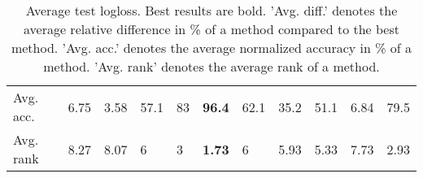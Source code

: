\begin{table}[ht!]
\begin{tabular}{lllllllllll}
  Avg. acc. & 6.75 & 3.58 & 57.1 & 83 & \textbf{96.4} & 62.1 & 35.2 & 51.1 & 6.84 & 79.5 \\ 
  Avg. rank & 8.27 & 8.07 & 6 & 3 & \textbf{1.73} & 6 & 5.93 & 5.33 & 7.73 & 2.93 \\ 
   \hline
\hline
\end{tabular}
\endgroup
\caption{Average test logloss. 
                  Best results are bold. 
                  'Avg. diff.' denotes the average relative difference in \% of a method compared to the best method.
                  'Avg. acc.' denotes the average normalized accuracy in \% of a method.
                  'Avg. rank' denotes the average rank of a method.} 
\label{TABLES/table_results_logloss_clustering}
\end{table}

